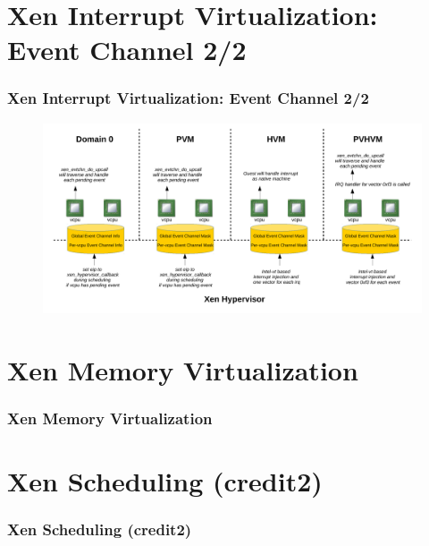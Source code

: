 \documentclass[aspectratio=169]{beamer}
\begin{document}

\section{Xen Interrupt Virtualization: Event Channel 2/2}
\begin{frame}
\frametitle{Xen Interrupt Virtualization: Event Channel 2/2}
\begin{figure}
\includegraphics[width=1.0\linewidth]{figures/evtchn.pdf}
\end{figure}
\end{frame}


\section{Xen Memory Virtualization}
\begin{frame}
\frametitle{Xen Memory Virtualization}
\end{frame}


\section{Xen Scheduling (credit2)}
\begin{frame}
\frametitle{Xen Scheduling (credit2)}
\end{frame}

\end{document}
